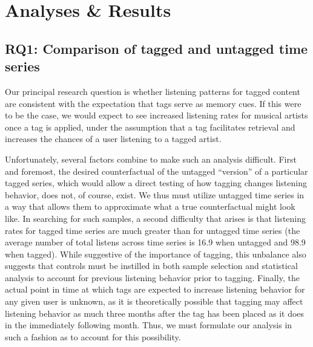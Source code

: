 \section{Analyses \& Results}
\label{sec_analyses}

\subsection{RQ1: Comparison of tagged and untagged time series}
Our principal research question is whether listening patterns for tagged content are consistent with the expectation that tags serve as memory cues. If this were to be the case, we would expect to see increased listening rates for musical artists once a tag is applied, under the assumption that a tag facilitates retrieval and increases the chances of a user listening to a tagged artist. 

Unfortunately, several factors combine to make such an analysis difficult.  First and foremost, the desired counterfactual of the untagged ``version'' of a particular tagged series, which would allow a direct testing of how tagging changes listening behavior, does not, of course, exist. We thus must utilize untagged time series in a way that allows them to approximate what a true counterfactual might look like.  In searching for such samples, a second difficulty that arises is that listening rates for tagged time series are much greater than for untagged time series (the average number of total listens across time series is 16.9 when untagged and 98.9 when tagged). While suggestive of the importance of tagging, this unbalance also suggests that controls must be instilled in both sample selection and statistical analysis to account for previous listening behavior prior to tagging. Finally, the actual point in time at which tags are expected to increase listening behavior for any given user is unknown, as it is theoretically possible that tagging may affect listening behavior as much three months after the tag has been placed as it does in the immediately following month.  Thus, we must formulate our analysis in such a fashion as to account for this possibility.  

